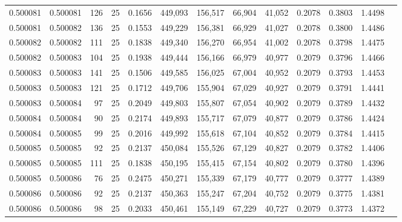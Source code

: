\begin{tabular}{rrrrrrrrrrrrr}
0.500081 & 0.500081 & 126 &  25 &                                     0.1656 & 449,093 & 156,517 &  66,904 &  41,052 & 0.2078 & 0.3803 & 1.4498 \\
0.500081 & 0.500082 & 136 &  25 &                                     0.1553 & 449,229 & 156,381 &  66,929 &  41,027 & 0.2078 & 0.3800 & 1.4486 \\
0.500082 & 0.500082 & 111 &  25 &                                     0.1838 & 449,340 & 156,270 &  66,954 &  41,002 & 0.2078 & 0.3798 & 1.4475 \\
0.500082 & 0.500083 & 104 &  25 &                                     0.1938 & 449,444 & 156,166 &  66,979 &  40,977 & 0.2079 & 0.3796 & 1.4466 \\
0.500083 & 0.500083 & 141 &  25 &                                     0.1506 & 449,585 & 156,025 &  67,004 &  40,952 & 0.2079 & 0.3793 & 1.4453 \\
0.500083 & 0.500083 & 121 &  25 &                                     0.1712 & 449,706 & 155,904 &  67,029 &  40,927 & 0.2079 & 0.3791 & 1.4441 \\
0.500083 & 0.500084 &  97 &  25 &                                     0.2049 & 449,803 & 155,807 &  67,054 &  40,902 & 0.2079 & 0.3789 & 1.4432 \\
0.500084 & 0.500084 &  90 &  25 &                                     0.2174 & 449,893 & 155,717 &  67,079 &  40,877 & 0.2079 & 0.3786 & 1.4424 \\
0.500084 & 0.500085 &  99 &  25 &                                     0.2016 & 449,992 & 155,618 &  67,104 &  40,852 & 0.2079 & 0.3784 & 1.4415 \\
0.500085 & 0.500085 &  92 &  25 &                                     0.2137 & 450,084 & 155,526 &  67,129 &  40,827 & 0.2079 & 0.3782 & 1.4406 \\
0.500085 & 0.500085 & 111 &  25 &                                     0.1838 & 450,195 & 155,415 &  67,154 &  40,802 & 0.2079 & 0.3780 & 1.4396 \\
0.500085 & 0.500086 &  76 &  25 &                                     0.2475 & 450,271 & 155,339 &  67,179 &  40,777 & 0.2079 & 0.3777 & 1.4389 \\
0.500086 & 0.500086 &  92 &  25 &                                     0.2137 & 450,363 & 155,247 &  67,204 &  40,752 & 0.2079 & 0.3775 & 1.4381 \\
0.500086 & 0.500086 &  98 &  25 &                                     0.2033 & 450,461 & 155,149 &  67,229 &  40,727 & 0.2079 & 0.3773 & 1.4372 \\

\end{tabular}
